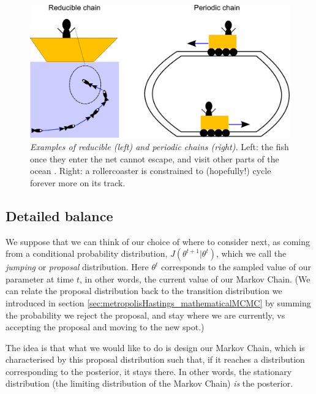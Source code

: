 \documentclass[11pt,fullpage]{book}
\begin{document}
\begin{figure}
\centerline{\includegraphics[width=1.5\textwidth]{metropolisHastings_reduciblePeriodic.pdf}}
\caption{\textit{Examples of reducible (left) and periodic chains (right).} Left: the fish once they enter the net cannot escape, and visit other parts of the ocean \cite{gebali2008}. Right: a rollercoaster is constrained to (hopefully!) cycle forever more on its track.}\label{fig:metropolisHastings_reduciblePeriodic}
\end{figure}


\subsection{Detailed balance}\label{sec:metropolisHastings_detailedBalance}
We suppose that we can think of our choice of where to consider next, as coming from a conditional probability distribution, $J(\theta^{t+1}|\theta^t)$, which we call the \textit{jumping} or \textit{proposal} distribution\cite{gelman2013bayesian}. Here $\theta^t$ corresponds to the sampled value of our parameter at time $t$, in other words, the current value of our Markov Chain. (We can relate the proposal distribution back to the transition distribution we introduced in section \ref{sec:metropolisHastings_mathematicalMCMC} by summing the probability we reject the proposal, and stay where we are currently, vs accepting the proposal and moving to the new spot.)

The idea is that what we would like to do is design our Markov Chain, which is characterised by this proposal distribution such that, if it reaches a distribution corresponding to the posterior, it stays there. In other words, the stationary distribution (the limiting distribution of the Markov Chain) \textit{is} the posterior.
\end{document}
